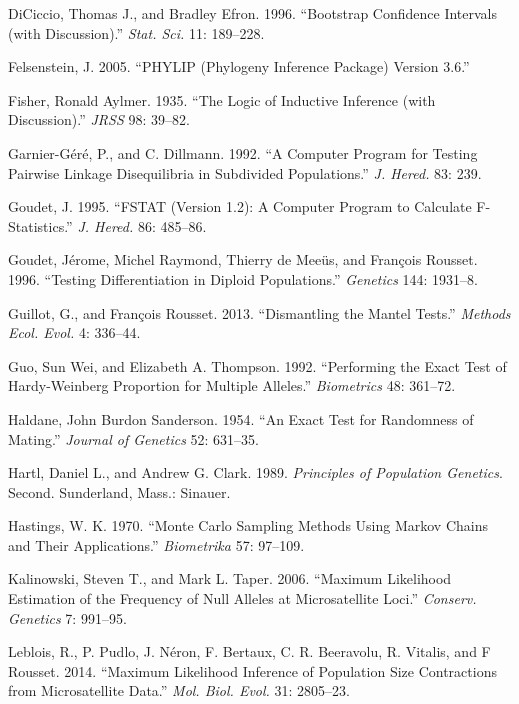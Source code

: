 \documentclass[12pt,]{book}
\begin{document}
\hypertarget{ref-DiCiccioE96}{}
DiCiccio, Thomas J., and Bradley Efron. 1996. ``Bootstrap Confidence
Intervals (with Discussion).'' \emph{Stat. Sci.} 11: 189--228.

\hypertarget{ref-Phylip}{}
Felsenstein, J. 2005. ``PHYLIP (Phylogeny Inference Package) Version
3.6.''

\hypertarget{ref-Fisher35}{}
Fisher, Ronald Aylmer. 1935. ``The Logic of Inductive Inference (with
Discussion).'' \emph{JRSS} 98: 39--82.

\hypertarget{ref-GarnierD92}{}
Garnier-Géré, P., and C. Dillmann. 1992. ``A Computer Program for
Testing Pairwise Linkage Disequilibria in Subdivided Populations.''
\emph{J. Hered.} 83: 239.

\hypertarget{ref-Goudet95}{}
Goudet, J. 1995. ``FSTAT (Version 1.2): A Computer Program to Calculate
F-Statistics.'' \emph{J. Hered.} 86: 485--86.

\hypertarget{ref-GoudetRMR96}{}
Goudet, Jérome, Michel Raymond, Thierry de Meeüs, and François Rousset.
1996. ``Testing Differentiation in Diploid Populations.''
\emph{Genetics} 144: 1931--8.

\hypertarget{ref-GuillotR13}{}
Guillot, G., and François Rousset. 2013. ``Dismantling the Mantel
Tests.'' \emph{Methods Ecol. Evol.} 4: 336--44.

\hypertarget{ref-GuoT92}{}
Guo, Sun Wei, and Elizabeth A. Thompson. 1992. ``Performing the Exact
Test of Hardy-Weinberg Proportion for Multiple Alleles.''
\emph{Biometrics} 48: 361--72.

\hypertarget{ref-Haldane54}{}
Haldane, John Burdon Sanderson. 1954. ``An Exact Test for Randomness of
Mating.'' \emph{Journal of Genetics} 52: 631--35.

\hypertarget{ref-HartlC2e}{}
Hartl, Daniel L., and Andrew G. Clark. 1989. \emph{Principles of
Population Genetics}. Second. Sunderland, Mass.: Sinauer.

\hypertarget{ref-Hastings70}{}
Hastings, W. K. 1970. ``Monte Carlo Sampling Methods Using Markov Chains
and Their Applications.'' \emph{Biometrika} 57: 97--109.

\hypertarget{ref-KalinowskiT06}{}
Kalinowski, Steven T., and Mark L. Taper. 2006. ``Maximum Likelihood
Estimation of the Frequency of Null Alleles at Microsatellite Loci.''
\emph{Conserv. Genetics} 7: 991--95.

\hypertarget{ref-LebloisX14}{}
Leblois, R., P. Pudlo, J. Néron, F. Bertaux, C. R. Beeravolu, R.
Vitalis, and F Rousset. 2014. ``Maximum Likelihood Inference of
Population Size Contractions from Microsatellite Data.'' \emph{Mol.
Biol. Evol.} 31: 2805--23.
\end{document}
